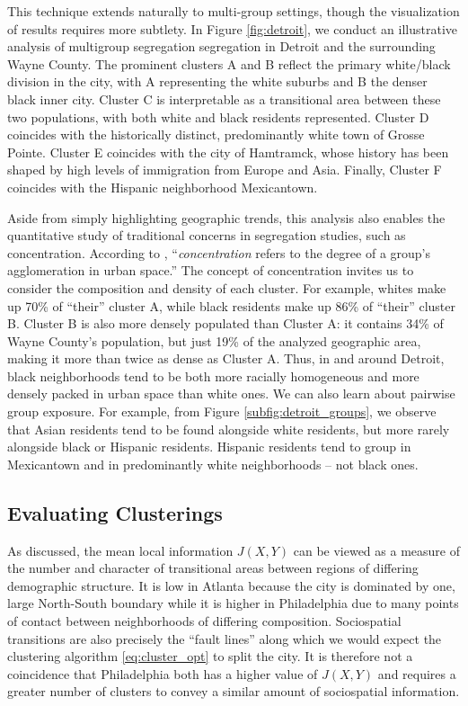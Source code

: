\documentclass[9pt,twocolumn,twoside]{pnas-new}
\begin{document}
	This technique extends naturally to multi-group settings, though the visualization of results requires more subtlety. In Figure \ref{fig:detroit}, we conduct an illustrative analysis of multigroup segregation segregation in Detroit and the surrounding Wayne County. The prominent clusters A and B reflect the primary white/black division in the city, with A representing the white suburbs and B the denser black inner city. Cluster C is interpretable as a transitional area between these two populations, with both white and black residents represented. Cluster D coincides with the historically distinct, predominantly white town of Grosse Pointe. Cluster E coincides with the city of Hamtramck, whose history has been shaped by high levels of immigration from Europe and Asia. Finally, Cluster F coincides with the Hispanic neighborhood Mexicantown. 

	Aside from simply highlighting geographic trends, this analysis also enables the quantitative study of traditional concerns in segregation studies, such as concentration. According to \cite{Massey1988}, ``\emph{concentration} refers to the degree of a group's agglomeration in urban space.'' The concept of concentration invites us to consider the composition and density of each cluster. For example, whites make up 70\% of ``their'' cluster A, while black residents make up 86\% of ``their'' cluster B. Cluster B is also more densely populated than Cluster A: it contains 34\% of Wayne County's population, but just 19\% of the analyzed geographic area, making it more than twice as dense as Cluster A. Thus, in and around Detroit, black neighborhoods tend to be both more racially homogeneous and more densely packed in urban space than white ones. We can also learn about pairwise group exposure. For example, from Figure  \ref{subfig:detroit_groups}, we observe that Asian residents tend to be found alongside white residents, but more rarely alongside black or Hispanic residents. Hispanic residents tend to group in Mexicantown and in predominantly white neighborhoods -- not black ones.

\subsection*{Evaluating Clusterings}
	As discussed, the mean local information $J(X,Y)$ can be viewed as a measure of the number and character of transitional areas between regions of differing demographic structure.  It is low in Atlanta because the city is dominated by one, large North-South boundary while it is higher in Philadelphia due to many points of contact between neighborhoods of differing composition. Sociospatial transitions are also precisely the ``fault lines'' along which we would expect the clustering algorithm \eqref{eq:cluster_opt} to split the city. It is therefore not a coincidence that Philadelphia both has a higher value of $J(X,Y)$ and requires a greater number of clusters to convey a similar amount of sociospatial information. 
\end{document}
